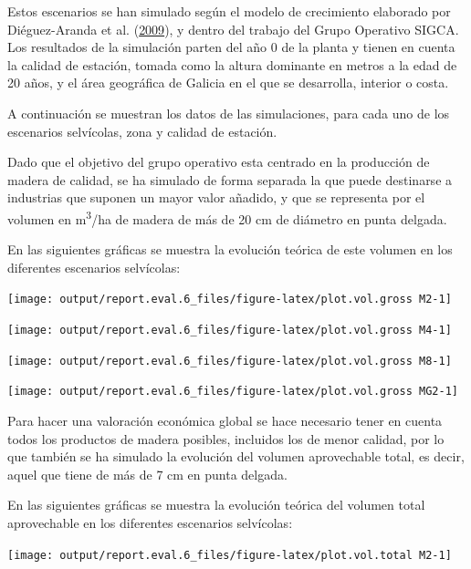 \documentclass[]{article}
\begin{document}
Estos escenarios se han simulado según el modelo de crecimiento
elaborado por Diéguez-Aranda et al.
(\protect\hyperlink{ref-Dieguez2009}{2009}), y dentro del trabajo del
Grupo Operativo SIGCA. Los resultados de la simulación parten del año 0
de la planta y tienen en cuenta la calidad de estación, tomada como la
altura dominante en metros a la edad de 20 años, y el área geográfica de
Galicia en el que se desarrolla, interior o costa.

A continuación se muestran los datos de las simulaciones, para cada uno
de los escenarios selvícolas, zona y calidad de estación.

Dado que el objetivo del grupo operativo esta centrado en la producción
de madera de calidad, se ha simulado de forma separada la que puede
destinarse a industrias que suponen un mayor valor añadido, y que se
representa por el volumen en m\textsuperscript{3}/ha de madera de más de
20 cm de diámetro en punta delgada.

En las siguientes gráficas se muestra la evolución teórica de este
volumen en los diferentes escenarios selvícolas:

\begin{center}\texttt{[image: output/report.eval.6\_files/figure-latex/plot.vol.gross M2-1]} \end{center}

\begin{center}\texttt{[image: output/report.eval.6\_files/figure-latex/plot.vol.gross M4-1]} \end{center}

\begin{center}\texttt{[image: output/report.eval.6\_files/figure-latex/plot.vol.gross M8-1]} \end{center}

\begin{center}\texttt{[image: output/report.eval.6\_files/figure-latex/plot.vol.gross MG2-1]} \end{center}

Para hacer una valoración económica global se hace necesario tener en
cuenta todos los productos de madera posibles, incluidos los de menor
calidad, por lo que también se ha simulado la evolución del volumen
aprovechable total, es decir, aquel que tiene de más de 7 cm en punta
delgada.

En las siguientes gráficas se muestra la evolución teórica del volumen
total aprovechable en los diferentes escenarios selvícolas:

\begin{center}\texttt{[image: output/report.eval.6\_files/figure-latex/plot.vol.total M2-1]} \end{center}
\end{document}
